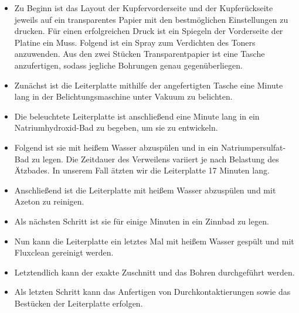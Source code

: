 \begin{itemize}
    \item Zu Beginn ist das Layout der Kupfervorderseite und der Kupferückseite jeweils auf ein transparentes Papier mit den bestmöglichen Einstellungen zu drucken.
    Für einen erfolgreichen Druck ist ein Spiegeln der Vorderseite der Platine ein Muss.
    Folgend ist ein Spray zum Verdichten des Toners anzuwenden.
    Aus den zwei Stücken Transparentpapier ist eine Tasche anzufertigen, sodass jegliche Bohrungen genau gegenüberliegen. \\

    \item Zunächst ist die Leiterplatte mithilfe der angefertigten Tasche eine Minute lang in der Belichtungsmaschine unter Vakuum zu belichten. \\

    \item Die beleuchtete Leiterplatte ist anschließend eine Minute lang in ein Natriumhydroxid-Bad zu begeben, um sie zu entwickeln. \\

    \item Folgend ist sie mit heißem Wasser abzuspülen und in ein Natriumpersulfat-Bad zu legen.
    Die Zeitdauer des Verweilens variiert je nach Belastung des Ätzbades.
    In unserem Fall ätzten wir die Leiterplatte 17 Minuten lang. \\

    \item Anschließend ist die Leiterplatte mit heißem Wasser abzuspülen und mit Azeton zu reinigen. \\

    \item Als nächsten Schritt ist sie für einige Minuten in ein Zinnbad zu legen. \\

    \item Nun kann die Leiterplatte ein letztes Mal mit heißem Wasser gespült und mit Fluxclean gereinigt werden.

    \item Letztendlich kann der exakte Zuschnitt und das Bohren durchgeführt werden. \\

    \item Als letzten Schritt kann das Anfertigen von Durchkontaktierungen sowie das Bestücken der Leiterplatte erfolgen.
\end{itemize}

